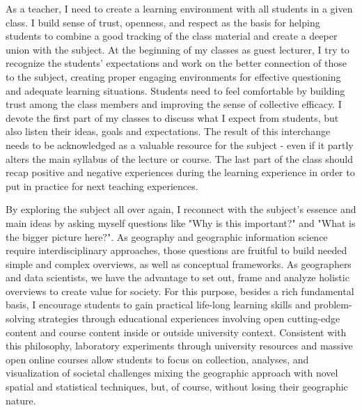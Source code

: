 As a teacher, I need to create a learning environment with all students in a given class. I build sense of trust, openness, and respect as the basis for helping students to combine a good tracking of the class material and create a deeper union with the subject. At the beginning of my classes as guest lecturer, I try to recognize the students' expectations and work on the better connection of those to the subject, creating proper engaging environments for effective questioning and adequate learning situations. Students need to feel comfortable by building trust among the class members and improving the sense of collective efficacy. I devote the first part of my classes to discuss what I expect from students, but also listen their ideas, goals and expectations. The result of this interchange needs to be acknowledged as a valuable resource for the subject -  even if it partly alters the main syllabus of the lecture or course. The last part of the class should recap positive and negative experiences during the learning experience in order to put in practice for next teaching experiences.\par





By exploring the subject all over again, I reconnect with the subject’s essence and main ideas by asking myself questions like "Why is this important?" and "What is the bigger picture here?". As geography and geographic information science require interdisciplinary approaches, those questions are fruitful to build needed simple and complex overviews, as well as conceptual frameworks. As geographers and data scientists, we have the advantage to set out, frame and analyze holistic overviews to create value for society. For this purpose, besides a rich fundamental basis, I encourage students to gain practical life-long learning skills and problem-solving strategies through educational experiences involving open cutting-edge content and course content inside or outside university context.  Consistent with this philosophy, laboratory experiments through university resources and massive open online courses allow students to focus on collection, analyses, and visualization of societal challenges mixing the geographic approach with novel spatial and statistical techniques, but, of course, without losing their geographic nature.\par



